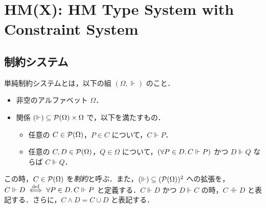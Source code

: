 \section{HM(X): HM Type System with Constraint System}

\cite{Odersky:1999}

\subsection{制約システム}

\begin{definition}
  単純制約システムとは，以下の組 $(\Omega, \Vdash)$ のこと．
  \begin{itemize}
    \item 非空のアルファベット $\Omega$．
    \item 関係 $({\Vdash}) \subseteq \mathcal{P}(\Omega) \times \Omega$ で，以下を満たすもの．
    \begin{itemize}
      \item 任意の $C \in \mathcal{P}(\Omega)$，$P \in C$ について，$C \Vdash P$．
      \item 任意の $C, D \in \mathcal{P}(\Omega)$，$Q \in \Omega$ について，$(\forall P \in D\ldotp C \Vdash P)$ かつ $D \Vdash Q$ ならば $C \Vdash Q$．
    \end{itemize}
  \end{itemize}
  この時，$C \in \mathcal{P}(\Omega)$ を\emph{制約}と呼ぶ．また，$({\Vdash}) \subseteq (\mathcal{P}(\Omega))^2$ への拡張を，$C \Vdash D \mathrel{\overset{\mathrm{def}}{\iff}} \forall P \in D\ldotp C \Vdash P$ と定義する．$C \Vdash D$ かつ $D \Vdash C$ の時，$C \dashVdash D$ と表記する．さらに，$C \land D = C \cup D$ と表記する．
\end{definition}

